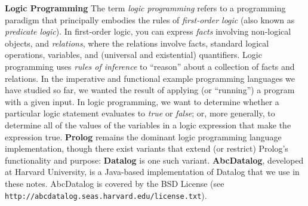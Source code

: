 \begin{minipage}[t]{\sw}
\slidenumber
\LARGE
{\bf Logic Programming}\exx
The term {\em logic programming} refers to
a programming paradigm
that principally embodies the rules of {\em first-order logic}
(also known as {\em predicate logic}).
In first-order logic,
you can express {\em facts} involving non-logical objects,
and {\em relations},
where the relations involve facts, standard logical operations,
variables, and (universal and existential) quantifiers.
Logic programming uses {\em rules of inference}
to ``reason'' about a collection of facts and relations.\exx
In the imperative and functional example programming languages
we have studied so far,
we wanted the result
of applying (or ``running'') a program with a given input.
In logic programming,
we want to determine whether a particular logic statement
evaluates to {\em true} or {\em false};
or, more generally,
to determine all of the values of the variables in a logic expression
that make the expression true.\exx
{\bf Prolog} remains the dominant logic programming language implementation,
though there exist variants that extend (or restrict)
Prolog's functionality and purpose:
{\bf Datalog} is one such variant.
{\bf AbcDatalog}, developed at Harvard University,
is a Java-based implementation of Datalog that we use in these notes.
AbcDatalog is covered by the BSD License
(see \verb'http://abcdatalog.seas.harvard.edu/license.txt').
\end{minipage}
